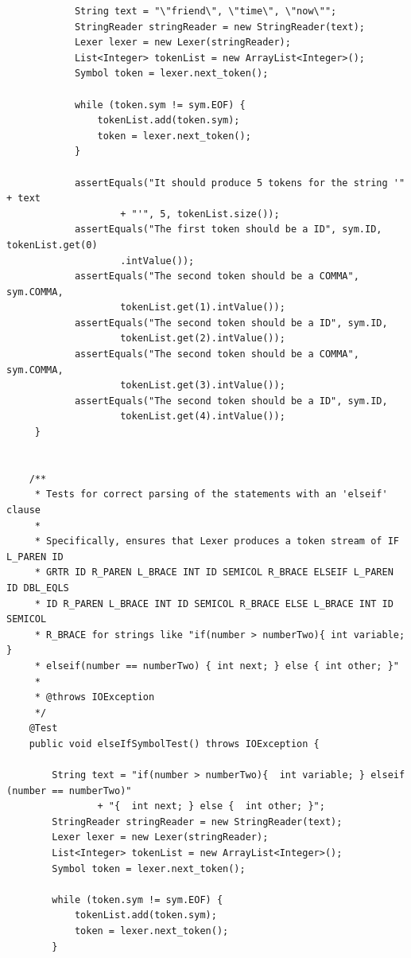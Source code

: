 \documentclass{report}
\begin{document}
\begin{verbatim}
			String text = "\"friend\", \"time\", \"now\"";
			StringReader stringReader = new StringReader(text);
			Lexer lexer = new Lexer(stringReader);
			List<Integer> tokenList = new ArrayList<Integer>();
			Symbol token = lexer.next_token();

			while (token.sym != sym.EOF) {
				tokenList.add(token.sym);
				token = lexer.next_token();
			}

			assertEquals("It should produce 5 tokens for the string '" + text
					+ "'", 5, tokenList.size());
			assertEquals("The first token should be a ID", sym.ID, tokenList.get(0)
					.intValue());
			assertEquals("The second token should be a COMMA", sym.COMMA,
					tokenList.get(1).intValue());
			assertEquals("The second token should be a ID", sym.ID,
					tokenList.get(2).intValue());
			assertEquals("The second token should be a COMMA", sym.COMMA,
					tokenList.get(3).intValue());
			assertEquals("The second token should be a ID", sym.ID,
					tokenList.get(4).intValue());
	 }


	/**
	 * Tests for correct parsing of the statements with an 'elseif' clause
	 * 
	 * Specifically, ensures that Lexer produces a token stream of IF L_PAREN ID
	 * GRTR ID R_PAREN L_BRACE INT ID SEMICOL R_BRACE ELSEIF L_PAREN ID DBL_EQLS
	 * ID R_PAREN L_BRACE INT ID SEMICOL R_BRACE ELSE L_BRACE INT ID SEMICOL
	 * R_BRACE for strings like "if(number > numberTwo){ int variable; }
	 * elseif(number == numberTwo) { int next; } else { int other; }"
	 * 
	 * @throws IOException
	 */
	@Test
	public void elseIfSymbolTest() throws IOException {

		String text = "if(number > numberTwo){  int variable; } elseif (number == numberTwo)"
				+ "{  int next; } else {  int other; }";
		StringReader stringReader = new StringReader(text);
		Lexer lexer = new Lexer(stringReader);
		List<Integer> tokenList = new ArrayList<Integer>();
		Symbol token = lexer.next_token();

		while (token.sym != sym.EOF) {
			tokenList.add(token.sym);
			token = lexer.next_token();
		}


\end{verbatim}
\end{document}
